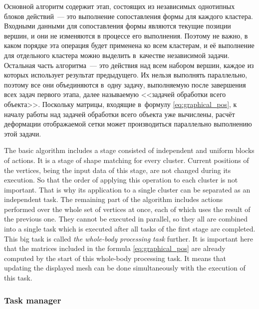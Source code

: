 \documentclass[a4paper, 12pt, titlepage]{extarticle}
\begin{document}
\begin{original}
        Основной алгоритм содержит этап, состоящих из независимых однотипных блоков
        действий~--- это выполнение сопоставления формы для каждого кластера. Входными данными для
        сопоставления формы являются текущие позиции вершин, и они не изменяются в процессе
        его выполнения. Поэтому не важно, в каком порядке эта операция будет применена ко всем
        кластерам, и её выполнение для отдельного кластера можно выделить в~качестве независимой задачи. Остальная
        часть алгоритма~--- это действия над всем набором вершин, каждое из которых использует
        результат предыдущего. Их нельзя выполнять параллельно, поэтому все они объединяются в~одну
        задачу, выполняемую после завершения всех задач первого этапа, далее называемую <<задачей
        обработки всего объекта>>. Поскольку матрицы, входящие
        в~формулу \eqref{eq:graphical_pos}, к началу работы над задачей обработки всего объекта уже вычислены,
        расчёт деформации отображаемой сетки может производиться параллельно выполнению этой задачи.
\end{original}

        The basic algorithm includes a stage consisted of independent and uniform blocks of
        actions. It is a stage of shape matching for every cluster. Current positions of the
        vertices, being the input data of this stage, are not changed during its execution. So that
        the order of applying this operation to each cluster is not important. That is why its
        application to a single cluster can be separated as an independent task. The remaining part
        of the algorithm includes actions performed over the whole set of vertices at once, each of
        which uses the result of the previous one. They cannot be executed in parallel, so they all
        are combined into a single task which is executed after all tasks of the first stage are
        completed. This big task is called \emph{the whole-body processing task} further. It is
        important here that the matrices included in the formula \eqref{eq:graphical_pos} are
        already computed by the start of this whole-body processing task. It means that updating the
        displayed mesh can be done simultaneously with the execution of this task.

      \subsubsection{Task manager}\label{sssec:task_manager}
\end{document}
